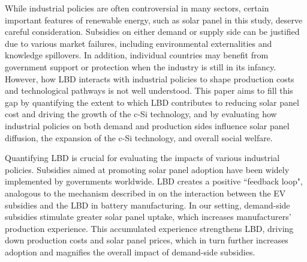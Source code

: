 \documentclass[12pt, letter]{article}
\begin{document}
While industrial policies are often controversial in many sectors, certain important features of renewable energy, such as solar panel in this study, deserve careful consideration. Subsidies on either demand or supply side can be justified due to various market failures, including environmental externalities and knowledge spillovers. In addition, individual countries may benefit from government support or protection when the industry is still in its infancy.
However, how LBD interacts with industrial policies to shape production costs and technological pathways is not well understood. This paper aims to fill this gap by quantifying the extent to which LBD contributes to reducing solar panel cost and driving the growth of the c-Si technology, and by evaluating how industrial policies on both demand and production sides influence solar panel diffusion, the expansion of the c-Si technology, and overall social welfare.

Quantifying LBD is crucial for evaluating the impacts of various industrial policies. 
Subsidies aimed at promoting solar panel adoption have been widely implemented by governments worldwide. LBD creates a positive ``feedback loop", analogous to the mechanism described in \citet{barwick2025drive} on the interaction between the EV subsidies and the LBD in battery manufacturing. In our setting, demand-side subsidies stimulate greater solar panel uptake, which increases manufacturers’ production experience. This accumulated experience strengthens LBD, driving down production costs and solar panel prices, which in turn further increases adoption and magnifies the overall impact of demand-side subsidies.
\end{document}
